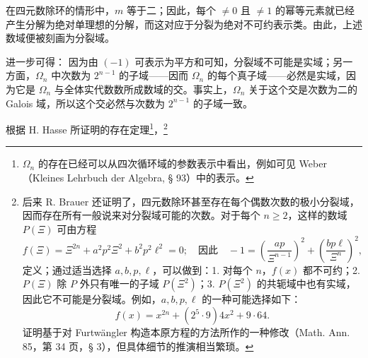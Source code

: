 在四元数除环的情形中，$m$ 等于二；因此，每个 $\ne0$ 且 $\ne1$ 的幂等元素就已经产生分解为绝对单理想的分解，而这对应于分裂为绝对不可约表示类。由此，上述数域便被刻画为分裂域。

进一步可得： 因为由 $(-1)$ 可表示为平方和可知，分裂域不可能是实域；另一方面，$\Omega_n$ 中次数为 $2^{n-1}$ 的子域——因而 $\Omega_n$ 的每个真子域——必然是实域，因为它是 $\Omega_n$ 与全体实代数数所成数域的交。事实上，$\Omega_n$ 关于这个交是次数为二的 Galois 域，所以这个交必然与次数为 $2^{n-1}$ 的子域一致。

根据 H. Hasse 所证明的存在定理\footnote{$\Omega_n$ 的存在已经可以从四次循环域的参数表示中看出，例如可见 Weber（Kleines Lehrbuch der Algebra, § 93）中的表示。}，\footnote{后来 R. Brauer 还证明了，四元数除环甚至存在每个偶数次数的极小分裂域，因而存在所有一般说来对分裂域可能的次数。对于每个 $n\ge2$，这样的数域 $P(\Xi)$ 可由方程
\[
 f(\Xi)=\Xi^{2n}+a^2p^2\Xi^2+b^2p^2\ell^2=0;
\quad \text{因此}\quad -1=\left(\frac{ap}{\Xi^{n-1}}\right)^2+
        \left(\frac{bp\ell}{\Xi^n}\right)^2,
\]
定义；通过适当选择 $a,b,p,\ell$，可以做到：1. 对每个 $n$，$f(x)$ 都不可约；2. $P(\Xi)$ 除 $P$ 外只有唯一的子域 $P(\Xi^2)$；3. $P(\Xi^2)$ 的共轭域中也有实域，因此它不可能是分裂域。例如，$a,b,p,\ell$ 的一种可能选择如下：
\[
        f(x)=x^{2n}+(2^5\cdot9)4x^2+9\cdot64.
\]
证明基于对 Furtwängler 构造本原方程的方法所作的一种修改（Math. Ann. 85，第 34 页，§ 3），但具体细节的推演相当繁琐。}
